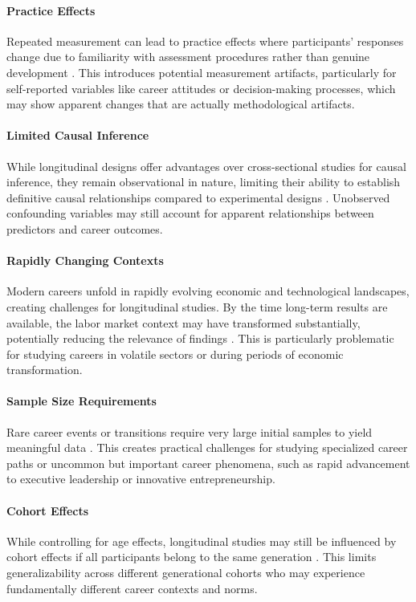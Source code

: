 \documentclass[../main.tex]{subfiles}
\begin{document}
\paragraph{Practice Effects}
Repeated measurement can lead to practice effects where participants' responses change due to familiarity with assessment procedures rather than genuine development \cite{wikipedia2024longitudinal}. This introduces potential measurement artifacts, particularly for self-reported variables like career attitudes or decision-making processes, which may show apparent changes that are actually methodological artifacts.

\paragraph{Limited Causal Inference}
While longitudinal designs offer advantages over cross-sectional studies for causal inference, they remain observational in nature, limiting their ability to establish definitive causal relationships compared to experimental designs \cite{wikipedia2024longitudinal}. Unobserved confounding variables may still account for apparent relationships between predictors and career outcomes.

\paragraph{Rapidly Changing Contexts}
Modern careers unfold in rapidly evolving economic and technological landscapes, creating challenges for longitudinal studies. By the time long-term results are available, the labor market context may have transformed substantially, potentially reducing the relevance of findings \cite{endvaw2024longitudinal}. This is particularly problematic for studying careers in volatile sectors or during periods of economic transformation.

\paragraph{Sample Size Requirements}
Rare career events or transitions require very large initial samples to yield meaningful data \cite{endvaw2024longitudinal}. This creates practical challenges for studying specialized career paths or uncommon but important career phenomena, such as rapid advancement to executive leadership or innovative entrepreneurship.

\paragraph{Cohort Effects}
While controlling for age effects, longitudinal studies may still be influenced by cohort effects if all participants belong to the same generation \cite{caruana2015longitudinal, wikipedia2024longitudinal}. This limits generalizability across different generational cohorts who may experience fundamentally different career contexts and norms.
\end{document}
